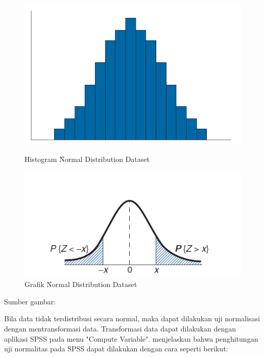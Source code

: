 \begin{figure}[ht]
	\centering
	\begin{minipage}[b]{0.45\linewidth}
		\centering
		\includegraphics[width=\textwidth]{pics/histogram-normal.png}
		\caption{Histogram \f{Normal Distribution Dataset}}
		\label{fig:histogramnormal}
	\end{minipage}
	\hspace{0.5cm}
	\begin{minipage}[b]{0.45\linewidth}
		\centering
		\includegraphics[width=\textwidth]{pics/normal-distribution.png}
		\caption{Grafik \f{Normal Distribution Dataset}}
		\label{fig:grafiknormal}
	\end{minipage}
\end{figure}
\begin{center}
	{\small Sumber gambar: \citep{buku.ross}}
\end{center}
Bila data tidak terdistribusi secara normal, maka dapat dilakukan uji normalisasi dengan mentransformasi data. Transformasi data dapat dilakukan dengan aplikasi SPSS pada menu "Compute Variable". \citet{buku.field} menjelaskan bahwa penghitungan uji normalitas pada SPSS dapat dilakukan dengan cara seperti berikut:
